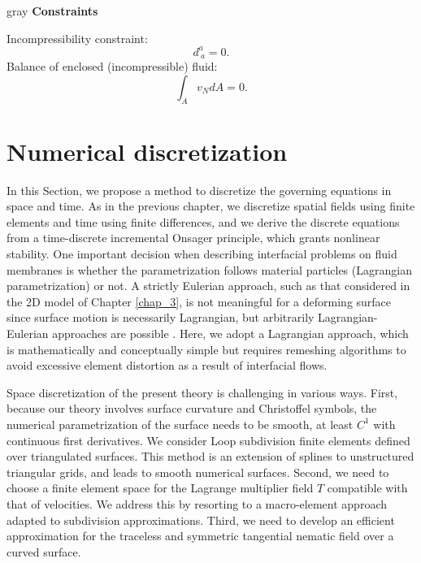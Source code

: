 \begin{center}
\begin{mybox}{gray}{}
		\textbf{Constraints}
		
		Incompressibility constraint:
		\begin{equation}  \label{box_d_eq_7}
			d^a_{~a} = 0.
		\end{equation}
		Balance of enclosed (incompressible) fluid:
		\begin{equation}  \label{box_d_eq_8}
			{\int_A}  v_N d A = 0.
		\end{equation}
	\end{mybox} \label{Box3}
\end{center}



\section{Numerical discretization} \label{chap8sec2}

 In this Section, we propose a method to discretize the governing equations in space and time. As in the previous chapter, we discretize spatial fields using finite elements and time using finite differences, and we derive the discrete equations from a time-discrete incremental Onsager principle, which grants nonlinear stability. One important decision when describing interfacial problems on fluid membranes is whether the parametrization follows material particles (Lagrangian parametrization) or not. A strictly Eulerian approach, such as that considered in the 2D model of Chapter \ref{chap_3}, is not meaningful for a deforming surface since surface motion is necessarily Lagrangian, but arbitrarily Lagrangian-Eulerian approaches are possible \cite{torres2019}. Here, we adopt a Lagrangian approach, which is mathematically and conceptually simple but requires remeshing algorithms to avoid excessive element distortion as a result of interfacial flows. 
 
 Space discretization of the present theory is challenging in various ways. First, because our theory involves surface curvature and Christoffel symbols, the numerical parametrization of the surface needs to be smooth, at least $C^1$ with continuous first derivatives. We consider Loop subdivision finite elements defined over triangulated surfaces. This method is an extension of splines to unstructured triangular grids, and leads to  smooth numerical surfaces. Second, we  need to choose a finite element space for the Lagrange multiplier field $T$ compatible with that of velocities. We address this by resorting to a macro-element approach adapted to subdivision approximations.  Third, we need to develop an efficient approximation for the traceless and symmetric tangential nematic field over a curved surface.  
 

